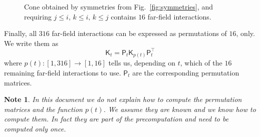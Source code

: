 \documentclass[]{article}
\newcommand{\Mat}[1]{\mathsf{#1}}  %
\theoremstyle{plain}
\newtheorem*{note}{Note}
\begin{document}
\begin{figure}[htbp]
  \centering
  \caption{Cone obtained by symmetries from Fig.~\ref{fig:symmetries}, and
    requiring $j\le i, \, k\le i, \, k\le j$ contains $16$ far-field
    interactions.}
  \label{fig:cone_sym}
\end{figure}
Finally, all $316$ far-field interactions can be expressed as permutations of
$16$, only. We write them as
\begin{equation}
  \label{eq:permut}
  \Mat{K}_t = \Mat{P}_t \Mat{K}_{p(t)} \Mat{P}_t^\top
\end{equation}
where $p(t):[1,316]\rightarrow[1,16]$ tells us, depending on $t$, which of the
$16$ remaining far-field interactions to use. $\Mat{P}_t$ are the
corresponding permutation matrices.
\begin{note}
  In this document we do not explain how to compute the permutation matrices
  and the function $p(t)$. We assume they are known and we know how to compute
  them. In fact they are part of the precomputation and need to be computed
  only once.
\end{note}
\end{document}
